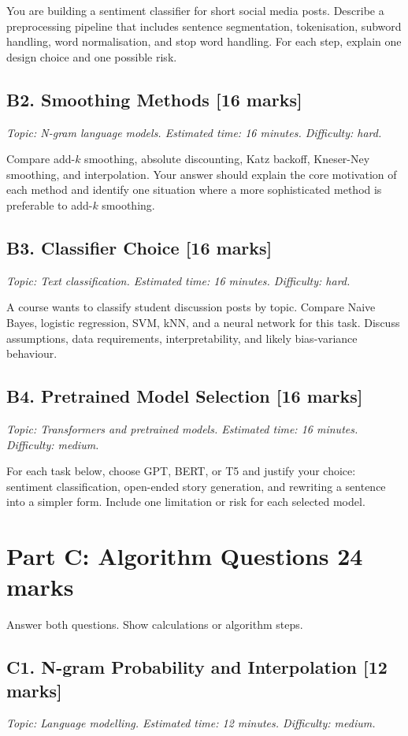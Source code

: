\documentclass[11pt,a4paper]{article}
\newcommand{\qmarks}[1]{\hfill\textbf{[#1 marks]}}
\newcommand{\questionmeta}[3]{\textit{Topic: #1. Estimated time: #2. Difficulty: #3.}}
\begin{document}
You are building a sentiment classifier for short social media posts. Describe a preprocessing pipeline that includes sentence segmentation, tokenisation, subword handling, word normalisation, and stop word handling. For each step, explain one design choice and one possible risk.

\subsection*{B2. Smoothing Methods \qmarks{16}}
\questionmeta{N-gram language models}{16 minutes}{hard}

Compare add-\(k\) smoothing, absolute discounting, Katz backoff, Kneser-Ney smoothing, and interpolation. Your answer should explain the core motivation of each method and identify one situation where a more sophisticated method is preferable to add-\(k\) smoothing.

\subsection*{B3. Classifier Choice \qmarks{16}}
\questionmeta{Text classification}{16 minutes}{hard}

A course wants to classify student discussion posts by topic. Compare Naive Bayes, logistic regression, SVM, kNN, and a neural network for this task. Discuss assumptions, data requirements, interpretability, and likely bias-variance behaviour.

\subsection*{B4. Pretrained Model Selection \qmarks{16}}
\questionmeta{Transformers and pretrained models}{16 minutes}{medium}

For each task below, choose GPT, BERT, or T5 and justify your choice: sentiment classification, open-ended story generation, and rewriting a sentence into a simpler form. Include one limitation or risk for each selected model.

\section*{Part C: Algorithm Questions \hfill 24 marks}

Answer both questions. Show calculations or algorithm steps.

\subsection*{C1. N-gram Probability and Interpolation \qmarks{12}}
\questionmeta{Language modelling}{12 minutes}{medium}
\end{document}
